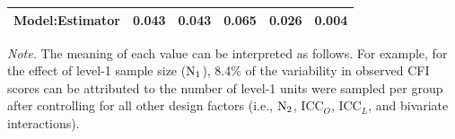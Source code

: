 \begin{table}[ht!]
\begin{threeparttable}
\begin{tabular}{l C{.75in} C{.75in} C{.75in} C{.75in} C{.75in}}
  Model:Estimator  & 0.043 & 0.043 & 0.065 & 0.026 & 0.004 \\
    \bottomrule
 \end{tabular}
 	\begin{tablenotes}
    {\small
        \textit{Note.} The meaning of each value can be interpreted as follows. For example, for the effect of level-1 sample size ($\rm N_1$), 8.4\% of the variability in observed CFI scores can be attributed to the number of level-1 units were sampled per group after controlling for all other design factors (i.e., $\rm N_2$, $\mathrm{ICC}_O$, $\mathrm{ICC}_L$, and bivariate interactions).
    }
 	\end{tablenotes}
 \end{threeparttable}
 \end{table}





